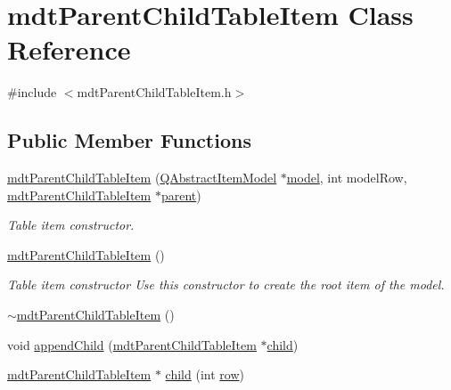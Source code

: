 \hypertarget{classmdt_parent_child_table_item}{\section{mdt\-Parent\-Child\-Table\-Item Class Reference}
\label{classmdt_parent_child_table_item}
}


{\ttfamily \#include $<$mdt\-Parent\-Child\-Table\-Item.\-h$>$}

\subsection*{Public Member Functions}
\begin{DoxyCompactItemize}
\item 
\hyperlink{classmdt_parent_child_table_item_afd38823879e25db1dca8099fb138042c}{mdt\-Parent\-Child\-Table\-Item} (\hyperlink{class_q_abstract_item_model}{Q\-Abstract\-Item\-Model} $\ast$\hyperlink{classmdt_parent_child_table_item_aceb2319dfd2707cfe8d93705f56bc43c}{model}, int model\-Row, \hyperlink{classmdt_parent_child_table_item}{mdt\-Parent\-Child\-Table\-Item} $\ast$\hyperlink{classmdt_parent_child_table_item_ac4491aa3959249d1a1a6f1582b975589}{parent})
\begin{DoxyCompactList}\small\item\em Table item constructor. \end{DoxyCompactList}\item 
\hyperlink{classmdt_parent_child_table_item_ad1a5c00ca1d0367d631548fa5732d41c}{mdt\-Parent\-Child\-Table\-Item} ()
\begin{DoxyCompactList}\small\item\em Table item constructor Use this constructor to create the root item of the model. \end{DoxyCompactList}\item 
\hyperlink{classmdt_parent_child_table_item_ac715724930bdad5795b227908c24c5e2}{$\sim$mdt\-Parent\-Child\-Table\-Item} ()
\item 
void \hyperlink{classmdt_parent_child_table_item_a182fff209f0a7c9319cbcf72908df69f}{append\-Child} (\hyperlink{classmdt_parent_child_table_item}{mdt\-Parent\-Child\-Table\-Item} $\ast$\hyperlink{classmdt_parent_child_table_item_ab6c36c72d8eb49fac2035d7e2b9474a3}{child})
\item 
\hyperlink{classmdt_parent_child_table_item}{mdt\-Parent\-Child\-Table\-Item} $\ast$ \hyperlink{classmdt_parent_child_table_item_ab6c36c72d8eb49fac2035d7e2b9474a3}{child} (int \hyperlink{classmdt_parent_child_table_item_ab2defb25c5033398a6fc4fcd7f015c95}{row})

\end{DoxyCompactItemize}
